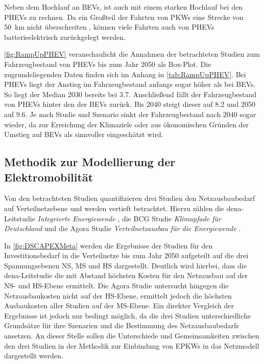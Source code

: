 Neben dem Hochlauf an \glspl{BEV}, ist auch mit einem starken Hochlauf bei den \glspl{PHEV} zu rechnen.
Da ein Großteil der Fahrten von \glspl{PKW} eine Strecke von \SI{50}{\km} nicht überschreiten \cite{Agora2019}, können viele Fahrten auch von \glspl{PHEV} batterieelektrisch zurückgelegt werden.

\autoref{fig:RampUpPHEV} veranschaulicht die Annahmen der betrachteten Studien zum Fahrzeugbestand von \glspl{PHEV} bis zum Jahr \num{2050} als Box-Plot.
Die zugrundeliegenden Daten finden sich im Anhang in \autoref{tab:RampUpPHEV}.
Bei \glspl{PHEV} liegt der Anstieg im Fahrzeugbestand anfangs sogar höher als bei \glspl{BEV}.
So liegt der Median 2030 bereits bei \SI{3.7}{\MioFZs}.
Anschließend fällt der Fahrzeugbestand von \glspl{PHEV} hinter den der \glspl{BEV} zurück.
Bis \num{2040} steigt dieser auf \SI{8.2}{\Mio} und \num{2050} auf \SI{9.6}{\MioStk}.
Je nach Studie und Szenario sinkt der Fahrzeugbestand nach \num{2040} sogar wieder, da zur Erreichung der Klimaziele oder aus ökonomischen Gründen der Umstieg auf \glspl{BEV} als sinnvoller eingeschätzt wird.




\subsection{Methodik zur Modellierung der Elektromobilität}

Von den betrachteten Studien quantifizieren drei Studien den Netzausbaubedarf auf Verteilnetzebene und werden vertieft betrachtet.
Hierzu zählen die dena-Leitstudie \textit{Integrierte Energiewende} \cite{DEAGH2018}, die BCG Studie \textit{Klimapfade für Deutschland} \cite{BCG2018} und die Agora Studie \textit{Verteilnetzausbau für die Energiewende} \cite{Agora2019}.\medskip

In \autoref{fig:DSCAPEXMeta} werden die Ergebnisse der Studien für den Investitionsbedarf in die Verteilnetze bis zum Jahr \num{2050} aufgeteilt auf die drei Spannungsebenen \gls{NS}, \gls{MS} und \gls{HS} dargestellt.
Deutlich wird hierbei, dass die dena-Leitstudie die mit Abstand höchsten Kosten für den Netzausbau auf der \gls{NS}- und \gls{HS}-Ebene ermittelt.
Die Agora Studie untersucht hingegen die Netzausbaukosten nicht auf der \gls{HS}-Ebene, ermittelt jedoch die höchsten Ausbaukosten aller Studien auf der \gls{MS}-Ebene.
Ein direkter Vergleich der Ergebnisse ist jedoch nur bedingt möglich, da die drei Studien unterschiedliche Grundsätze für ihre Szenarien und die Bestimmung des Netzausbaubedarfs ansetzen.
An dieser Stelle sollen die Unterschiede und Gemeinsamkeiten zwischen den drei Studien in der Methodik zur Einbindung von \glspl{EPKW} in das Netzmodell dargestellt werden.

